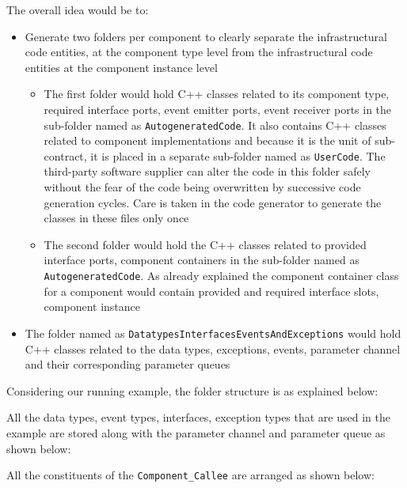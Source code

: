 The overall idea would be to:
\begin{itemize}
\item Generate two folders per component to clearly separate the infrastructural code entities, at the component type level from the infrastructural code entities at the component instance level 
\begin{itemize}
\item The first folder would hold C++ classes related to its component type, required interface ports, event emitter ports, event receiver ports in the sub-folder named as \texttt{AutogeneratedCode}. It also contains C++ classes related to component implementations and because it is the unit of sub-contract, it is placed in a separate sub-folder named as \texttt{UserCode}. The third-party software supplier can alter the code in this folder safely without the fear of the code being overwritten by successive code generation cycles. Care is taken in the code generator to generate the classes in these files only once  
\item The second folder would hold the C++ classes related to provided interface ports, component containers in the sub-folder named as \texttt{AutogeneratedCode}. As already explained the component container class for a component would contain provided and required interface slots, component instance   
\end{itemize} 
\item The folder named as \texttt{Datatypes\allowbreak Interfaces\allowbreak EventsAnd\allowbreak Exceptions} would hold C++ classes related to the data types, exceptions, events, parameter channel and their corresponding parameter queues 
\end{itemize}

Considering our running example, the folder structure is as explained below:

All the data types, event types, interfaces, exception types that are used in the example are stored along with the parameter channel and parameter queue as shown below:

\newpage 


All the constituents of the \texttt{Component\_Callee} are arranged as shown below:


